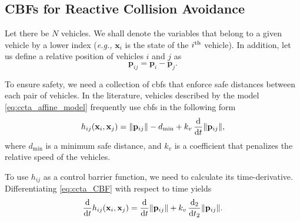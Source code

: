 \subsection{CBFs for Reactive Collision Avoidance}
Let there be $N$ vehicles.
We shall denote the variables that belong to a given vehicle by a lower index (\emph{e.g.,} $\mathbf{x}_{i}$ is the state of the $i^{\rm th}$ vehicle).
In addition, let us define a relative position of vehicles $i$ and $j$ as
\begin{equation}
    \mathbf{p}_{ij} = \mathbf{p}_{i} - \mathbf{p}_{j}.
    \label{eq:ccta_p_ij}
\end{equation}

To ensure safety, we need a collection of \glspl{cbf} that enforce safe distances between each pair of vehicles.
In the literature, vehicles described by the model \eqref{eq:ccta_affine_model} frequently use \glspl{cbf} in the following form \cite{basso_safety-critical_2020,thyri_reactive_2020}
\begin{equation}
    h_{ij}(\mathbf{x}_{i}, \mathbf{x}_{j}) = \|\mathbf{p}_{ij}\| - d_{\min} + k_v\,\frac{\rm d}{{\rm d}t}\|\mathbf{p}_{ij}\|,
    \label{eq:ccta_CBF}
\end{equation}
where $d_{\min}$ is a minimum safe distance, and $k_v$ is a coefficient that penalizes the relative speed of the vehicles.

To use $h_{ij}$ as a control barrier function, we need to calculate its time-derivative.
Differentiating \eqref{eq:ccta_CBF} with respect to time yields
\begin{equation}
    \frac{\rm d}{{\rm d}t}h_{ij}(\mathbf{x}_{i}, \mathbf{x}_{j}) = \frac{\rm d}{{\rm d}t}\|\mathbf{p}_{ij}\| + k_v\,\frac{\rm d_2}{{\rm d}t_2}\|\mathbf{p}_{ij}\|.
\end{equation}



